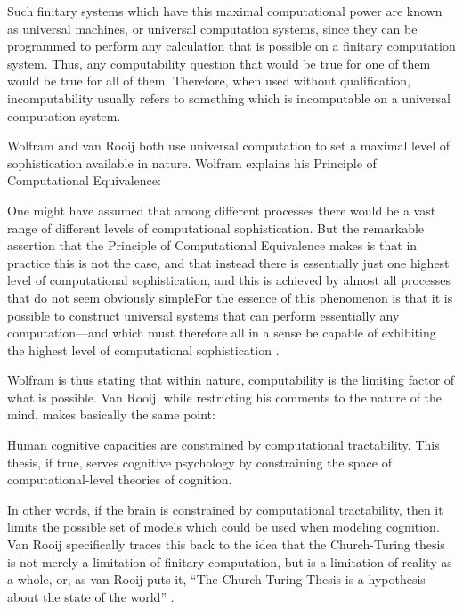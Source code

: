 Such finitary systems which have this maximal computational power are known as universal machines, or universal computation systems, since they can be programmed to perform any calculation that is possible on a finitary computation system.  Thus, any computability question that would be true for one of them would be true for all of them.  Therefore, when used without qualification, incomputability usually refers to something which is incomputable on a universal computation system.

Wolfram and van Rooij both use universal computation to set a maximal level of sophistication available in nature.  Wolfram explains his Principle of Computational Equivalence:

\begin{quoting}
One might have assumed that among different processes there would be a vast range of different levels of computational sophistication.  But the remarkable assertion that the Principle of Computational Equivalence makes is that in practice this is not the case, and that instead there is essentially just one highest level of computational sophistication, and this is achieved by almost all processes that do not seem obviously simple{\jdots}For the essence of this phenomenon is that it is possible to construct universal systems that can perform essentially any computation---and which must therefore all in a sense be capable of exhibiting the highest level of computational sophistication \citep[][p.~717]{wolfram2002}.
\end{quoting}

Wolfram is thus stating that within nature, computability is the limiting factor of what is possible.  Van Rooij, while restricting his comments to the nature of the mind, makes basically the same point:

\begin{quoting}
Human cognitive capacities are constrained by computational tractability.  This thesis, if true, serves cognitive psychology by constraining the space of computational-level theories of cognition. \citep[][p.~939]{vanrooij2008}
\end{quoting}

In other words, if the brain is constrained by computational tractability, then it limits the possible set of models which could be used when modeling cognition.  Van Rooij specifically traces this back to the idea that the Church-Turing thesis is not merely a limitation of finitary computation, but is a limitation of reality as a whole, or, as van Rooij puts it, ``The Church-Turing Thesis is a hypothesis about the state of the world'' \citep[][p.~943]{vanrooij2008}.

